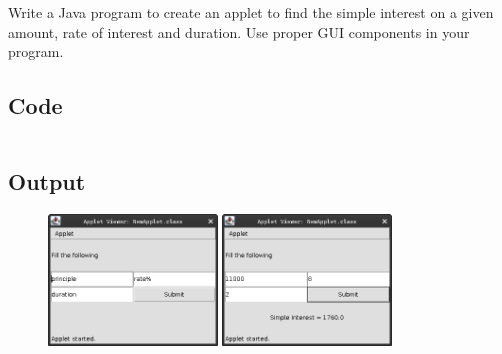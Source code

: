 \documentclass[../main.tex]{subfiles}
\begin{document}
Write a Java program to create an applet to find the simple interest on a
given amount, rate of interest and duration. Use proper GUI components in your
program.

\subsection{Code}
\inputminted[frame=lines, breaklines, breakanywhere, numberblanklines=false]{java}{./programs/prog17/Interest.java}

\newpage
\subsection{Output}
\begin{figure}[h!]
	\centering
	\includegraphics[width=0.4\textwidth]{./assets/p17-s1.png}
	\includegraphics[width=0.4\textwidth]{./assets/p17-s2.png}
\end{figure}
\end{document}
